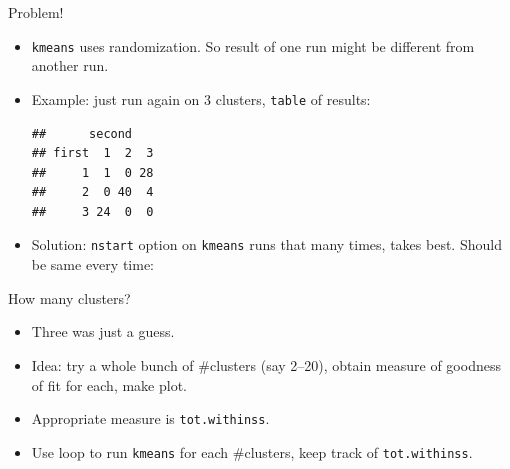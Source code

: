 \begin{frame}[fragile]{Problem!}
  
  \begin{itemize}
  \item \texttt{kmeans} uses randomization. So result of one run might
    be different from another run.
  \item Example: just run again on 3 clusters, \texttt{table} of results:

    
\begin{knitrout}
\color{fgcolor}\begin{kframe}
\begin{alltt}
\hlkwb{=}\hlstd{(vital.s[}\hlopt{:}\hlstd{],}\hlstd{)}
\hlstd{(}\hlopt{$}
      \hlopt{$}
\end{alltt}
\begin{verbatim}
##      second
## first  1  2  3
##     1  1  0 28
##     2  0 40  4
##     3 24  0  0
\end{verbatim}
\end{kframe}
\end{knitrout}
\item Solution: \texttt{nstart} option on \texttt{kmeans} runs that
  many times, takes best. Should be same every time:
\begin{knitrout}
\color{fgcolor}\begin{kframe}
\begin{alltt}
\hlkwb{=}\hlstd{,}\hlstd{=}\hlstd{)}
\end{alltt}
\end{kframe}
\end{knitrout}
    
    
  \end{itemize}
  
\end{frame}

\begin{frame}[fragile]{How many clusters?}
  
  \begin{itemize}
  \item Three was just a guess.
  \item Idea: try a whole bunch of \#clusters (say 2--20), obtain measure of
    goodness of fit for each, make plot.
  \item Appropriate measure is \texttt{tot.withinss}.
  \item Use loop to run \texttt{kmeans} for each \#clusters, keep
    track of \texttt{tot.withinss}.
  \end{itemize}
  
\end{frame}

